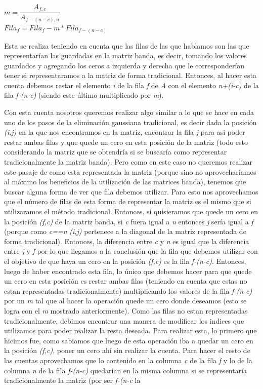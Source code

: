 \documentclass[10pt, a4paper]{article}
\begin{document}
\begin{center}
$m = \dfrac{A_{f,c}}{A_{f-(n-c),n}}$ \\
$Fila_{f} = Fila_{f}-m*Fila_{f-(n-c)}$
\end{center}

Esta se realiza teniendo en cuenta que las filas de las que hablamos son las que representar\'ian las guardadas en la matriz banda, es decir, tomando los valores guardados y agregando los ceros a izquierda y derecha que le corresponder\'ian tener si representaramos a la matriz de forma tradicional. Entonces, al hacer esta cuenta debemos restar el elemento \textit{i} de la fila \textit{f} de \textit{A} con el elemento \textit{n+(i-c)} de la fila \textit{f-(n-c)} (siendo este \'ultimo multiplicado por \textit{m}).

Con esta cuenta nosotros queremos realizar algo similar a lo que se hace en cada uno de los pasos de la eliminaci\'on gaussiana tradicional, es decir dada la posici\'on \textit{(i,j)} en la que nos encontramos en la matriz, encontrar la fila \textit{j} para asi poder restar ambas filas y que quede un cero en esta posici\'on de la matriz (todo esto considerando la matriz que se obtendr\'ia si se buscar\'ia como representar tradicionalmente la matriz banda). Pero como en este caso no queremos realizar este pasaje de como esta representada la matriz (porque sino no aprovechar\'iamos al m\'aximo los beneficios de la utilizaci\'on de las matrices banda), tenemos que buscar alguna forma de ver que fila debemos utilizar. Para esto nos aprovechamos que el n\'umero de filas de esta forma de representar la matriz es el mismo que si utilizaramos el m\'etodo tradicional. Entonces, si quisieramos que quede un cero en la posici\'on \textit{(f,c)} de la matriz banda, si \textit{c} fuera igual a \textit{n} entonces \textit{j} ser\'ia igual a \textit{f} (porque como \textit{c==n} \textit{(i,j)} pertenece a la diagonal de la matriz representada de forma tradicional). Entonces, la diferencia entre \textit{c} y \textit{n} es igual que la diferencia entre \textit{j} y \textit{f} por lo que llegamos a la conclusi\'on que la fila que debemos utilizar con el objetivo de que haya un cero en la posici\'on \textit{(f,c)} es la fila \textit{f-(n-c)}. Entonces, luego de haber encontrado esta fila, lo \'unico que debemos hacer para que quede un cero en esta posici\'on es restar ambas filas (teniendo en cuenta que estas no estan representadas tradicionalmente) multiplicando los valores de la fila \textit{f-(n-c)} por un \textit{m} tal que al hacer la operaci\'on quede un cero donde deseamos (esto se logra con el \textit{m} mostrado anteriormente). Como las filas no estan representadas tradicionalmente, debimos encontrar una manera de modificar los indices que utilizamos para poder realizar la resta deseada. Para realizar esta, lo primero que hicimos fue, como sabiamos que luego de esta operaci\'on iba a quedar un cero en la posici\'on \textit{(f,c)}, poner un cero ah\'i sin realizar la cuenta. Para hacer el resto de las cuentas aprovechamos que lo contenido en la columna \textit{c} de la fila \textit{f} y lo de la columna \textit{n} de la fila \textit{f-(n-c)} quedar\'ian en la misma columna si se representar\'ia tradicionalmente la matriz (por ser \textit{f-(n-c} la 
\end{document}

